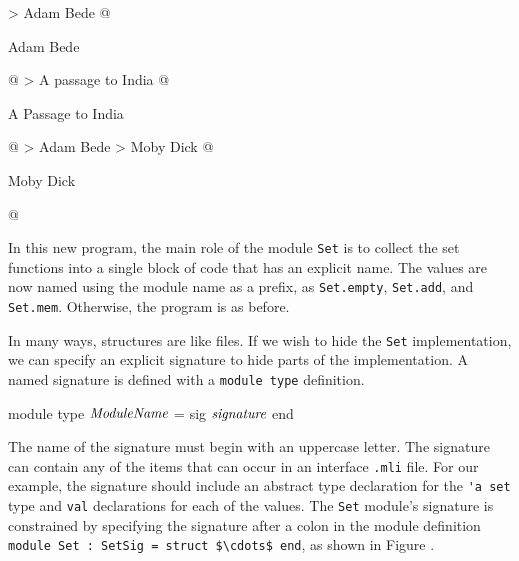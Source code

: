 \begin{ocaml}
> Adam Bede
@
\begin{topoutput}
Adam Bede
\end{topoutput}
@
> A passage to India
@
\begin{topoutput}
A Passage to India
\end{topoutput}
@
> Adam Bede
> Moby Dick
@
\begin{topoutput}
Moby Dick
\end{topoutput}
@
\end{ocaml}
%
In this new program, the main role of the
module \hbox{\lstinline/Set/} is to collect the set functions into a
single block of code that has an explicit name. The values are now
named using the module name as a prefix,
as \hbox{\lstinline/Set.empty/}, \hbox{\lstinline/Set.add/},
and \hbox{\lstinline/Set.mem/}. Otherwise, the program is as before.

\label{keyword:sig}
In many ways, structures are like files.  If we wish to hide
the \hbox{\lstinline$Set$} implementation, we can specify an explicit
signature to hide parts of the implementation.  A named signature is
defined with a \hbox{\lstinline/module type/} definition.

\begin{ocaml}
module type $\textit{\rmfamily ModuleName}$ = sig $\textit{\rmfamily signature}$ end
\end{ocaml}
%
The name of the signature must begin with an uppercase letter. The
signature can contain any of the items that can occur in an
interface \hbox{\lstinline/.mli/} file. For our example, the signature
should include an abstract type declaration for
the \hbox{\lstinline/'a set/} type and \hbox{\lstinline/val/}
declarations for each of the values. The \hbox{\lstinline/Set/}
module's signature is constrained by specifying the signature after a
colon in the module definition
%
\hbox{\lstinline/module Set : SetSig = struct $\cdots$ end/},
%
as shown in Figure .

